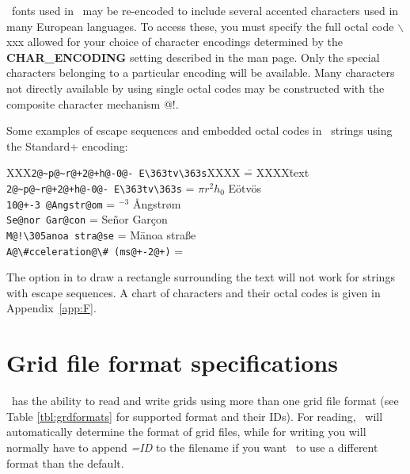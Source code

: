 \PS\ fonts used in \GMT\ may be re-encoded to include
several accented characters used in many European languages.  To
access these, you must specify the full octal code $\backslash$xxx
allowed for your choice of character encodings
determined by the \textbf{CHAR\_ENCODING} setting described
in the  man page.  Only the special characters
belonging to a particular encoding will
be available.  Many characters not directly available by
using single octal codes may be constructed with the composite
character mechanism @!.
 
Some examples of escape sequences and embedded octal codes in \GMT\ strings using the
Standard+ encoding: 

\begin{tabbing}
XXX\=\verb|2@~p@~r@+2@+h@-0@- E\363tv\363s|XXXX \== XXXX\=text \kill 
\>\verb|2@~p@~r@+2@+h@-0@- E\363tv\363s| \> = $\pi r^2h_0$ E\"{o}tv\"{o}s \\ 
\>\verb|10@+-3 @Angstr@om|		 \> =	$^{-3}$ \AA ngstr\o m \\ 
\>\verb|Se@nor Gar@con|	 \> = \> Se\~{n}or Gar\c{c}on \\ 
\>\verb|M@!\305anoa stra@se|	 \> = \> M\={a}noa stra\ss e \\ 
\>\verb|A@\#cceleration@\# (ms@+-2@+)|	 \> = \> 
\end{tabbing} 

The option in  to draw a rectangle surrounding the text
will not work for strings with escape sequences.  A chart of characters
and their octal codes is given in Appendix~\ref{app:F}. 

\section{Grid file format specifications}
\label{sec:grdformats}
\GMT\ has the ability to read and write grids using more than one grid file
format (see Table \ref{tbl:grdformats} for supported format and their IDs).  For
reading, \GMT\ will automatically determine the format of grid files, while for writing
you will normally have to append \emph{=ID} to the filename if you want \GMT\ to use a different format
than the default.

